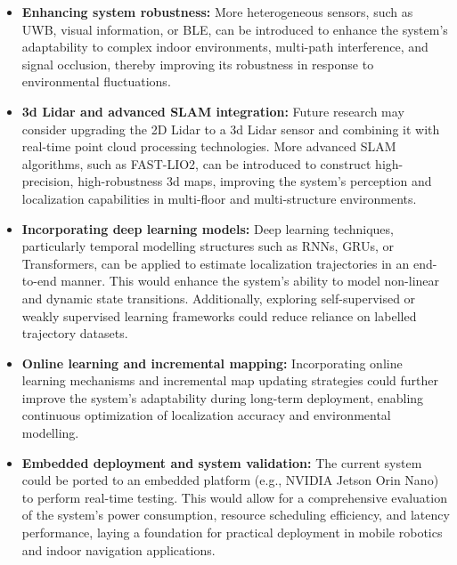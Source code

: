 \documentclass[12pt,a4paper]{article}
\numberwithin{equation}{section}
\begin{document}
\begin{itemize}
    \item \textbf{Enhancing system robustness:} More heterogeneous sensors, such as UWB, visual information, or BLE, can be introduced to enhance the system's adaptability to complex indoor environments, multi-path interference, and signal occlusion, thereby improving its robustness in response to environmental fluctuations.
    
    \item \textbf{3d Lidar and advanced SLAM integration:} Future research may consider upgrading the 2D Lidar to a 3d Lidar sensor and combining it with real-time point cloud processing technologies. More advanced SLAM algorithms, such as FAST-LIO2, can be introduced to construct high-precision, high-robustness 3d maps, improving the system's perception and localization capabilities in multi-floor and multi-structure environments.
    
    \item \textbf{Incorporating deep learning models:} Deep learning techniques, particularly temporal modelling structures such as RNNs, GRUs, or Transformers, can be applied to estimate localization trajectories in an end-to-end manner. This would enhance the system's ability to model non-linear and dynamic state transitions. Additionally, exploring self-supervised or weakly supervised learning frameworks could reduce reliance on labelled trajectory datasets.
    
    \item \textbf{Online learning and incremental mapping:} Incorporating online learning mechanisms and incremental map updating strategies could further improve the system's adaptability during long-term deployment, enabling continuous optimization of localization accuracy and environmental modelling.
    
    \item \textbf{Embedded deployment and system validation:} The current system could be ported to an embedded platform (e.g., NVIDIA Jetson Orin Nano) to perform real-time testing. This would allow for a comprehensive evaluation of the system's power consumption, resource scheduling efficiency, and latency performance, laying a foundation for practical deployment in mobile robotics and indoor navigation applications.
\end{itemize}
\end{document}
